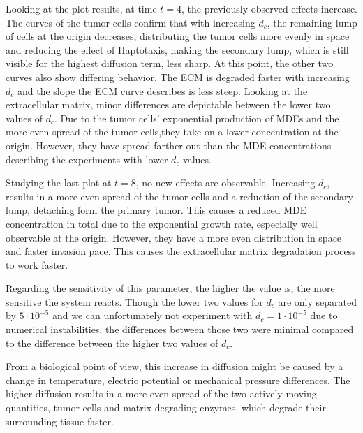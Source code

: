 Looking at the plot results, at time $t=4$, the previously observed effects increase. The curves of the tumor cells confirm that with increasing $d_c$, the remaining lump of cells at the origin decreases, distributing the tumor cells more evenly in space and reducing the effect of Haptotaxis, making the secondary lump, which is still visible for the highest diffusion term, less sharp. At this point, the other two curves also show differing behavior. The ECM is degraded faster with increasing $d_c$ and the slope the ECM curve describes is less steep. Looking at the extracellular matrix, minor differences are depictable between the lower two values of $d_c$. Due to the tumor cells' exponential production of MDEs and the more even spread of the tumor cells,they take on a lower concentration at the origin. However, they have spread farther out than the MDE concentrations describing the experiments with lower $d_c$ values.

Studying the last plot at $t=8$, no new effects are observable. Increasing $d_c$, results in a more even spread of the tumor cells and a reduction of the secondary lump, detaching form the primary tumor. This causes a reduced MDE concentration in total due to the exponential growth rate, especially well observable at the origin. However, they have a more even distribution in space and faster invasion pace. This causes the extracellular matrix degradation process to work faster.

Regarding the sensitivity of this parameter, the higher the value is, the more sensitive the system reacts. Though the lower two values for $d_c$ are only separated by $5\cdot 10^{-5}$ and we can unfortunately not experiment with $d_c=1 \cdot 10^{-5}$ due to numerical instabilities, the differences between those two were minimal compared to the difference between the higher two values of $d_c$.

From a biological point of view, this increase in diffusion might be caused by a change in temperature, electric potential or mechanical pressure differences. The higher diffusion results in a more even spread of the two actively moving quantities, tumor cells and matrix-degrading enzymes, which degrade their surrounding tissue faster.



